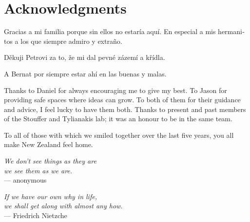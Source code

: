 {}
\chapter*{Acknowledgments}

\begin{otherlanguage}{spanish}
Gracias a mi familia porque sin ellos no estaría aquí.
En especial a mis hermanitos a los que siempre admiro y extraño.
\end{otherlanguage}
\begin{otherlanguage}{spanish}
Děkuji Petrovi za to, že mi dal pevné zázemí a křídla.
\end{otherlanguage}
\begin{otherlanguage}{spanish}
A Bernat por siempre estar ahí en las buenas y malas.
\end{otherlanguage}

Thanks to Daniel for always encouraging me to give my best.
To Jason for providing safe spaces where ideas can grow.
To both of them for their guidance and advice, I feel lucky to have them both.
Thanks to present and past members of the Stouffer and Tylianakis lab; it was an honour to be in the same team.

To all of those with which we smiled together over the last five years, you all make New Zealand feel home.

\begin{flushright}{\slshape
    We don't see things as they are \\
    we see them as we are.} \\ \medskip
    --- anonymous
\end{flushright}

\bigskip

\begin{flushright}{\slshape
    If we have our own why in life, \\
    we shall get along with almost any how.} \\ \medskip
    --- Friedrich Nietzche
\end{flushright}
